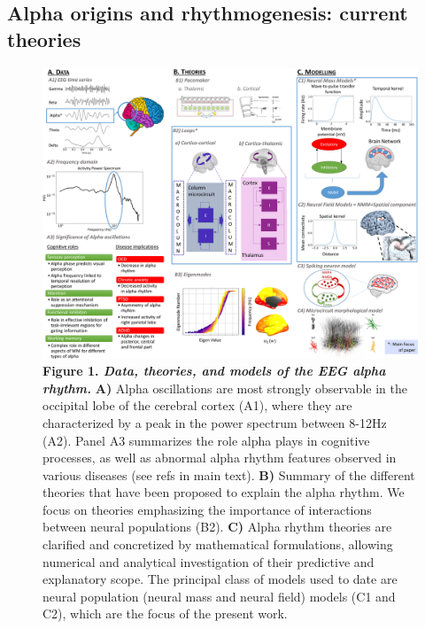 \documentclass[12pt,twoside]{article}
\begin{document}
\subsection{Alpha origins and rhythmogenesis: current theories}

\begin{figure}[H]
    \centering
    \includegraphics[scale = 0.4]{Images/Fig1__Overview_final.png} %
    \caption*{\textbf{Figure 1. \textit{Data, theories, and models of the EEG alpha rhythm.}} \textbf{A)} Alpha oscillations are most strongly observable in the occipital lobe of the cerebral cortex (A1), where they are characterized by a peak in the power spectrum between 8-12Hz (A2). Panel A3 summarizes the role alpha plays in cognitive processes, as well as abnormal alpha rhythm features observed in various diseases (see refs in main text). \textbf{B)} Summary of the different theories that have been proposed to explain the alpha rhythm. We focus on theories emphasizing the importance of interactions between neural populations (B2). \textbf{C)} Alpha rhythm theories are clarified and concretized by mathematical formulations, allowing numerical and analytical investigation of their predictive and explanatory scope. The principal class of models used to date are neural population (neural mass and neural field) models (C1 and C2), which are the focus of the present work.}
    \label{fig:Overview}
\end{figure}
\end{document}
